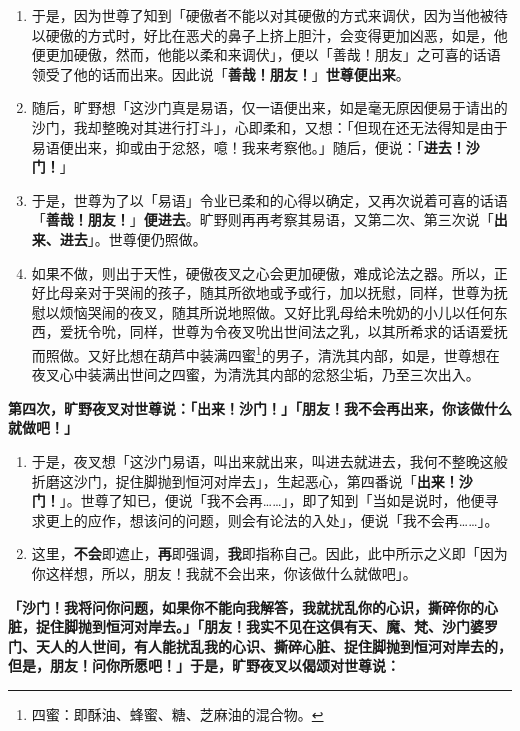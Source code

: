 \begin{enumerate}
\item 于是，因为世尊了知到「硬傲者不能以对其硬傲的方式来调伏，因为当他被待以硬傲的方式时，好比在恶犬的鼻子上挤上胆汁，会变得更加凶恶，如是，他便更加硬傲，然而，他能以柔和来调伏」，便以「善哉！朋友」之可喜的话语领受了他的话而出来。因此说「\textbf{善哉！朋友！}」\textbf{世尊便出来}。
\item 随后，旷野想「这沙门真是易语，仅一语便出来，如是毫无原因便易于请出的沙门，我却整晚对其进行打斗」，心即柔和，又想：「但现在还无法得知是由于易语便出来，抑或由于忿怒，噫！我来考察他。」随后，便说：「\textbf{进去！沙门！}」
\item 于是，世尊为了以「易语」令业已柔和的心得以确定，又再次说着可喜的话语「\textbf{善哉！朋友！}」\textbf{便进去}。旷野则再再考察其易语，又第二次、第三次说「\textbf{出来、进去}」。世尊便仍照做。
\item 如果不做，则出于天性，硬傲夜叉之心会更加硬傲，难成论法之器。所以，正好比母亲对于哭闹的孩子，随其所欲地或予或行，加以抚慰，同样，世尊为抚慰以烦恼哭闹的夜叉，随其所说地照做。又好比乳母给未吮奶的小儿以任何东西，爱抚令吮，同样，世尊为令夜叉吮出世间法之乳，以其所希求的话语爱抚而照做。又好比想在葫芦中装满四蜜\footnote{四蜜：即酥油、蜂蜜、糖、芝麻油的混合物。}的男子，清洗其内部，如是，世尊想在夜叉心中装满出世间之四蜜，为清洗其内部的忿怒尘垢，乃至三次出入。\end{enumerate}

\textbf{第四次，旷野夜叉对世尊说：「出来！沙门！」「朋友！我不会再出来，你该做什么就做吧！」}

\begin{enumerate}\item 于是，夜叉想「这沙门易语，叫出来就出来，叫进去就进去，我何不整晚这般折磨这沙门，捉住脚抛到恒河对岸去」，生起恶心，第四番说「\textbf{出来！沙门！}」。世尊了知已，便说「我不会再……」，即了知到「当如是说时，他便寻求更上的应作，想该问的问题，则会有论法的入处」，便说「我不会再……」。
\item 这里，\textbf{不会}即遮止，\textbf{再}即强调，\textbf{我}即指称自己。因此，此中所示之义即「因为你这样想，所以，朋友！我就不会出来，你该做什么就做吧」。\end{enumerate}

\textbf{「沙门！我将问你问题，如果你不能向我解答，我就扰乱你的心识，撕碎你的心脏，捉住脚抛到恒河对岸去。」「朋友！我实不见在这俱有天、魔、梵、沙门婆罗门、天人的人世间，有人能扰乱我的心识、撕碎心脏、捉住脚抛到恒河对岸去的，但是，朋友！问你所愿吧！」于是，旷野夜叉以偈颂对世尊说：}

